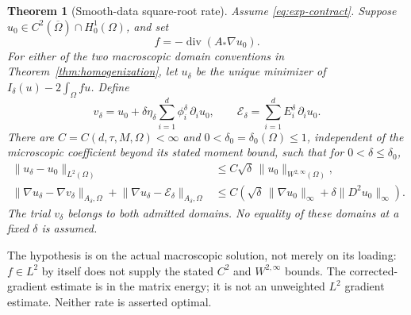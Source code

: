 \documentclass[11pt,a4paper]{article}
\numberwithin{equation}{section}
\newtheorem{theorem}{Theorem}[section]
\theoremstyle{definition}
\theoremstyle{remark}\newtheorem{remark}[theorem]{Remark}
\DeclareMathOperator{\diver}{div}
\newcommand{\norm}[1]{\lVert #1\rVert}
\begin{document}
\begin{theorem}[Smooth-data square-root rate]\label{thm:quantitative}
Assume \eqref{eq:exp-contract}. Suppose
\(u_0\in C^2(\overline\Omega)\cap H^1_0(\Omega)\), and set
\[
 f=-\diver(A_*\nabla u_0).
\]
For either of the two macroscopic domain conventions in
Theorem~\ref{thm:homogenization}, let \(u_\delta\) be the unique
minimizer of \(I_\delta(u)-2\int_\Omega fu\).
Define
\begin{equation}\label{eq:quantitative-trial}
 v_\delta=u_0+\delta\eta_\delta
                  \sum_{i=1}^d\phi_i^\delta\,\partial_i u_0,
 \qquad
 \mathcal E_\delta=\sum_{i=1}^dE_i^\delta\,\partial_i u_0 .
\end{equation}
There are \(C=C(d,\tau,M,\Omega)<\infty\) and
\(0<\delta_0=\delta_0(\Omega)\leq1\), independent of the
microscopic coefficient beyond its stated moment bound, such that
for \(0<\delta\leq\delta_0\),
\begin{align}
 \norm{u_\delta-u_0}_{L^2(\Omega)}
 &\leq C\sqrt\delta\,\norm{u_0}_{W^{2,\infty}(\Omega)},
                         \label{eq:quantitative-L2}\\
 \norm{\nabla u_\delta-\nabla v_\delta}_{A_\delta,\Omega}
 +\norm{\nabla u_\delta-\mathcal E_\delta}_{A_\delta,\Omega}
 &\leq C\left(\sqrt\delta\,\norm{\nabla u_0}_\infty
                 +\delta\norm{D^2u_0}_\infty\right).
                         \label{eq:quantitative-energy}
\end{align}
The trial \(v_\delta\) belongs to both admitted domains.
No equality of these domains at a fixed \(\delta\) is assumed.
\end{theorem}

The hypothesis is on the actual macroscopic solution, not merely
on its loading: \(f\in L^2\) by itself does not supply the stated
\(C^2\) and \(W^{2,\infty}\) bounds. The corrected-gradient estimate
is in the matrix energy; it is not an unweighted \(L^2\) gradient
estimate. Neither rate is asserted optimal.
\end{document}
